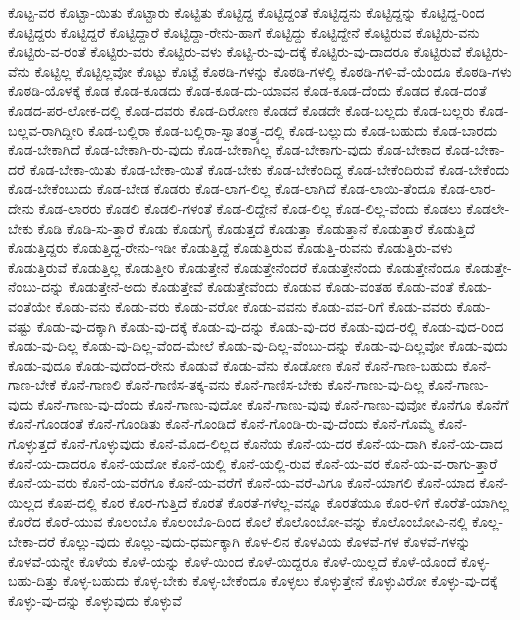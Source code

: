 {ಕೊಟ್ಟ-ವರ
ಕೊಟ್ಟಾ-ಯಿತು
ಕೊಟ್ಟಾರು
ಕೊಟ್ಟಿತು
ಕೊಟ್ಟಿದ್ದ
ಕೊಟ್ಟಿದ್ದಂತೆ
ಕೊಟ್ಟಿದ್ದನು
ಕೊಟ್ಟಿದ್ದನ್ನು
ಕೊಟ್ಟಿದ್ದ-ರಿಂದ
ಕೊಟ್ಟಿದ್ದರು
ಕೊಟ್ಟಿದ್ದರೆ
ಕೊಟ್ಟಿದ್ದಾರೆ
ಕೊಟ್ಟಿದ್ದಾ-ರೇನು-ಹಾಗೆ
ಕೊಟ್ಟಿದ್ದು
ಕೊಟ್ಟಿದ್ದೇನೆ
ಕೊಟ್ಟಿರುವ
ಕೊಟ್ಟಿರು-ವನು
ಕೊಟ್ಟಿರು-ವ-ರಂತೆ
ಕೊಟ್ಟಿರು-ವರು
ಕೊಟ್ಟಿರು-ವಳು
ಕೊಟ್ಟಿ-ರು-ವು-ದಕ್ಕೆ
ಕೊಟ್ಟಿರು-ವು-ದಾದರೂ
ಕೊಟ್ಟಿರುವೆ
ಕೊಟ್ಟಿರು-ವೆನು
ಕೊಟ್ಟಿಲ್ಲ
ಕೊಟ್ಟಿಲ್ಲವೋ
ಕೊಟ್ಟು
ಕೊಟ್ಟೆ
ಕೊಠಡಿ-ಗಳನ್ನು
ಕೊಠಡಿ-ಗಳಲ್ಲಿ
ಕೊಠಡಿ-ಗಳಿ-ವೆ-ಯೆಂದೂ
ಕೊಠಡಿ-ಗಳು
ಕೊಠಡಿ-ಯೊಳಕ್ಕೆ
ಕೊಡ
ಕೊಡ-ಕೂಡದು
ಕೊಡ-ಕೂಡ-ದು-ಯಾವನ
ಕೊಡ-ಕೂಡ-ದೆಂದು
ಕೊಡದ
ಕೊಡ-ದಂತೆ
ಕೊಡದ-ಪರ-ಲೋಕ-ದಲ್ಲಿ
ಕೊಡ-ದವರು
ಕೊಡ-ದಿರೋಣ
ಕೊಡದೆ
ಕೊಡದೇ
ಕೊಡ-ಬಲ್ಲದು
ಕೊಡ-ಬಲ್ಲರು
ಕೊಡ-ಬಲ್ಲವ-ರಾಗಿದ್ದೀರಿ
ಕೊಡ-ಬಲ್ಲಿರಾ
ಕೊಡ-ಬಲ್ಲಿರಾ-ಸ್ವಾತಂತ್ರ್ಯ-ದಲ್ಲಿ
ಕೊಡ-ಬಲ್ಲುದು
ಕೊಡ-ಬಹುದು
ಕೊಡ-ಬಾರದು
ಕೊಡ-ಬೇಕಾಗಿದೆ
ಕೊಡ-ಬೇಕಾಗಿ-ರು-ವುದು
ಕೊಡ-ಬೇಕಾಗಿಲ್ಲ
ಕೊಡ-ಬೇಕಾಗು-ವುದು
ಕೊಡ-ಬೇಕಾದ
ಕೊಡ-ಬೇಕಾ-ದರೆ
ಕೊಡ-ಬೇಕಾ-ಯಿತು
ಕೊಡ-ಬೇಕಾ-ಯಿತೆ
ಕೊಡ-ಬೇಕು
ಕೊಡ-ಬೇಕೆಂದಿದ್ದ
ಕೊಡ-ಬೇಕೆಂದಿರುವೆ
ಕೊಡ-ಬೇಕೆಂದು
ಕೊಡ-ಬೇಕೆಂಬುದು
ಕೊಡ-ಬೇಡ
ಕೊಡರು
ಕೊಡ-ಲಾಗ-ಲಿಲ್ಲ
ಕೊಡ-ಲಾಗಿದೆ
ಕೊಡ-ಲಾಯಿ-ತೆಂದೂ
ಕೊಡ-ಲಾರ-ದೇನು
ಕೊಡ-ಲಾರರು
ಕೊಡಲಿ
ಕೊಡಲಿ-ಗಳಂತೆ
ಕೊಡ-ಲಿದ್ದೇನೆ
ಕೊಡ-ಲಿಲ್ಲ
ಕೊಡ-ಲಿಲ್ಲ-ವೆಂದು
ಕೊಡಲು
ಕೊಡಲೇ-ಬೇಕು
ಕೊಡಿ
ಕೊಡಿ-ಸು-ತ್ತಾರೆ
ಕೊಡು
ಕೊಡುಗೈ
ಕೊಡುತ್ತದೆ
ಕೊಡುತ್ತಾ
ಕೊಡುತ್ತಾನೆ
ಕೊಡುತ್ತಾರೆ
ಕೊಡುತ್ತಿದೆ
ಕೊಡುತ್ತಿದ್ದರು
ಕೊಡುತ್ತಿದ್ದ-ರೇನು-ಇಡೀ
ಕೊಡುತ್ತಿದ್ದೆ
ಕೊಡುತ್ತಿರುವ
ಕೊಡುತ್ತಿ-ರುವನು
ಕೊಡುತ್ತಿರು-ವಳು
ಕೊಡುತ್ತಿರುವೆ
ಕೊಡುತ್ತಿಲ್ಲ
ಕೊಡುತ್ತೀರಿ
ಕೊಡುತ್ತೇನೆ
ಕೊಡುತ್ತೇನೆಂದರೆ
ಕೊಡುತ್ತೇನೆಂದು
ಕೊಡುತ್ತೇನೆಂದೂ
ಕೊಡುತ್ತೇ-ನೆಂಬು-ದನ್ನು
ಕೊಡುತ್ತೇನೆ-ಅದು
ಕೊಡುತ್ತೇವೆ
ಕೊಡುತ್ತೇವೆಂದು
ಕೊಡುವ
ಕೊಡು-ವಂತಹ
ಕೊಡು-ವಂತೆ
ಕೊಡು-ವಂತೆಯೇ
ಕೊಡು-ವನು
ಕೊಡು-ವರು
ಕೊಡು-ವರೋ
ಕೊಡು-ವವನು
ಕೊಡು-ವವ-ರಿಗೆ
ಕೊಡು-ವವರು
ಕೊಡು-ವಷ್ಟು
ಕೊಡು-ವು-ದಕ್ಕಾಗಿ
ಕೊಡು-ವು-ದಕ್ಕೆ
ಕೊಡು-ವು-ದನ್ನು
ಕೊಡು-ವು-ದರ
ಕೊಡು-ವುದ-ರಲ್ಲಿ
ಕೊಡು-ವುದ-ರಿಂದ
ಕೊಡು-ವು-ದಿಲ್ಲ
ಕೊಡು-ವು-ದಿಲ್ಲ-ವೆಂದ-ಮೇಲೆ
ಕೊಡು-ವು-ದಿಲ್ಲ-ವೆಂಬು-ದನ್ನು
ಕೊಡು-ವು-ದಿಲ್ಲವೋ
ಕೊಡು-ವುದು
ಕೊಡು-ವುದೂ
ಕೊಡು-ವುದೆಂದ-ರೇನು
ಕೊಡುವೆ
ಕೊಡು-ವೆನು
ಕೊಡೋಣ
ಕೊನೆ
ಕೊನೆ-ಗಾಣ-ಬಹುದು
ಕೊನೆ-ಗಾಣ-ಬೇಕೆ
ಕೊನೆ-ಗಾಣಲಿ
ಕೊನೆ-ಗಾಣಿಸ-ತಕ್ಕ-ವನು
ಕೊನೆ-ಗಾಣಿಸ-ಬೇಕು
ಕೊನೆ-ಗಾಣು-ವು-ದಿಲ್ಲ
ಕೊನೆ-ಗಾಣು-ವುದು
ಕೊನೆ-ಗಾಣು-ವು-ದೆಂದು
ಕೊನೆ-ಗಾಣು-ವುದೋ
ಕೊನೆ-ಗಾಣು-ವುವು
ಕೊನೆ-ಗಾಣು-ವುವೋ
ಕೊನೆಗೂ
ಕೊನೆಗೆ
ಕೊನೆ-ಗೊಂಡಂತೆ
ಕೊನೆ-ಗೊಂಡಿತು
ಕೊನೆ-ಗೊಂಡಿದೆ
ಕೊನೆ-ಗೊಂಡಿ-ರು-ವು-ದೆಂದು
ಕೊನೆ-ಗೊಮ್ಮೆ
ಕೊನೆ-ಗೊಳ್ಳುತ್ತದೆ
ಕೊನೆ-ಗೊಳ್ಳುವುದು
ಕೊನೆ-ಮೊದ-ಲಿಲ್ಲದ
ಕೊನೆಯ
ಕೊನೆ-ಯ-ದರ
ಕೊನೆ-ಯ-ದಾಗಿ
ಕೊನೆ-ಯ-ದಾದ
ಕೊನೆ-ಯ-ದಾದರೂ
ಕೊನೆ-ಯದೋ
ಕೊನೆ-ಯಲ್ಲಿ
ಕೊನೆ-ಯಲ್ಲಿ-ರುವ
ಕೊನೆ-ಯ-ವರ
ಕೊನೆ-ಯ-ವ-ರಾಗು-ತ್ತಾರೆ
ಕೊನೆ-ಯ-ವರು
ಕೊನೆ-ಯ-ವರೆಗೂ
ಕೊನೆ-ಯ-ವರೆಗೆ
ಕೊನೆ-ಯ-ವರೆ-ವಿಗೂ
ಕೊನೆ-ಯಾಗಲಿ
ಕೊನೆ-ಯಾದ
ಕೊನೆ-ಯಿಲ್ಲದ
ಕೊಪ-ದಲ್ಲಿ
ಕೊರ
ಕೊರ-ಗುತ್ತಿದೆ
ಕೊರತೆ
ಕೊರತೆ-ಗಳೆಲ್ಲ-ವನ್ನೂ
ಕೊರತೆಯೂ
ಕೊರ-ಳಿಗೆ
ಕೊರೆತೆ-ಯಾಗಿಲ್ಲ
ಕೊರೆದ
ಕೊರೆ-ಯುವ
ಕೊಲಂಬೊ
ಕೊಲಂಬೊ-ದಿಂದ
ಕೊಲೆ
ಕೊಲೊಂಬೋ-ವನ್ನು
ಕೊಲೊಂಬೋವಿ-ನಲ್ಲಿ
ಕೊಲ್ಲ-ಬೇಕಾ-ದರೆ
ಕೊಲ್ಲು-ವುದು
ಕೊಲ್ಲು-ವುದು-ಧರ್ಮಕ್ಕಾಗಿ
ಕೊಳ-ಲಿನ
ಕೊಳವಿಯ
ಕೊಳವೆ-ಗಳ
ಕೊಳವೆ-ಗಳನ್ನು
ಕೊಳವೆ-ಯನ್ನೇ
ಕೊಳೆಯ
ಕೊಳೆ-ಯನ್ನು
ಕೊಳೆ-ಯಿಂದ
ಕೊಳೆ-ಯಿದ್ದರೂ
ಕೊಳೆ-ಯಿಲ್ಲದೆ
ಕೊಳೆ-ಯೊಂದೆ
ಕೊಳ್ಳ-ಬಹು-ದಿತ್ತು
ಕೊಳ್ಳ-ಬಹುದು
ಕೊಳ್ಳ-ಬೇಕು
ಕೊಳ್ಳ-ಬೇಕೆಂದೂ
ಕೊಳ್ಳಲು
ಕೊಳ್ಳುತ್ತೇನೆ
ಕೊಳ್ಳುವಿರೋ
ಕೊಳ್ಳು-ವು-ದಕ್ಕೆ
ಕೊಳ್ಳು-ವು-ದನ್ನು
ಕೊಳ್ಳುವುದು
ಕೊಳ್ಳುವೆ
}
